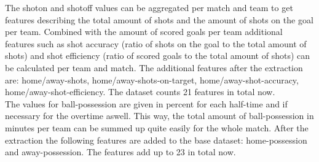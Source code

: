 The shoton and shotoff values can be aggregated per match and team to get features describing the total amount of shots and the amount of shots on the goal per team. Combined with the amount of scored goals per team additional features such as shot accuracy (ratio of shots on the goal to the total amount of shots) and shot efficiency (ratio of scored goals to the total amount of shots) can be calculated per team and match.
\newline
The additional features after the extraction are: home/away-shots, home/away-shots-on-target, home/away-shot-accuracy, home/away-shot-efficiency. The dataset counts 21 features in total now.
\\
The values for ball-possession are given in percent for each half-time and if necessary for the overtime aswell. This way, the total amount of ball-possession in minutes per team can be summed up quite easily for the whole match.
\newline
After the extraction the following features are added to the base dataset: home-possession and away-possession. The features add up to 23 in total now.
